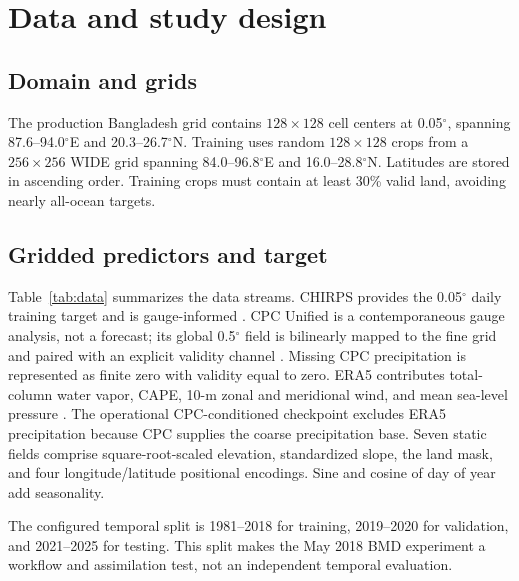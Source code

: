 \documentclass[10pt,twocolumn]{article}
\begin{document}
\section{Data and study design}

\subsection{Domain and grids}

The production Bangladesh grid contains $128\times128$ cell centers at 0.05$^\circ$, spanning 87.6--94.0$^\circ$E and 20.3--26.7$^\circ$N. Training uses random $128\times128$ crops from a $256\times256$ WIDE grid spanning 84.0--96.8$^\circ$E and 16.0--28.8$^\circ$N. Latitudes are stored in ascending order. Training crops must contain at least 30\% valid land, avoiding nearly all-ocean targets.

\subsection{Gridded predictors and target}

Table~\ref{tab:data} summarizes the data streams. CHIRPS provides the 0.05$^\circ$ daily training target and is gauge-informed \cite{funk2015}. CPC Unified is a contemporaneous gauge analysis, not a forecast; its global 0.5$^\circ$ field is bilinearly mapped to the fine grid and paired with an explicit validity channel \cite{chen2008}. Missing CPC precipitation is represented as finite zero with validity equal to zero. ERA5 contributes total-column water vapor, CAPE, 10-m zonal and meridional wind, and mean sea-level pressure \cite{hersbach2020}. The operational CPC-conditioned checkpoint excludes ERA5 precipitation because CPC supplies the coarse precipitation base. Seven static fields comprise square-root-scaled elevation, standardized slope, the land mask, and four longitude/latitude positional encodings. Sine and cosine of day of year add seasonality.

The configured temporal split is 1981--2018 for training, 2019--2020 for validation, and 2021--2025 for testing. This split makes the May 2018 BMD experiment a workflow and assimilation test, not an independent temporal evaluation.
\end{document}
